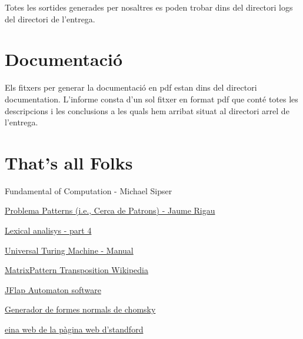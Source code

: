 \documentclass[12pt,a4paper]{report}
\begin{document}
Totes les sortides generades per nosaltres es poden trobar dins del directori logs del directori de l'entrega.

\section{Documentació}

Els fitxers per generar la documentació en pdf estan dins del directori documentation. L'informe consta d'un sol fitxer en format pdf que conté totes les descripcions i les conclusions a les quals hem arribat situat al directori arrel de l'entrega.

\section{That's all Folks}



\begin{thebibliography}{9}
Fundamental of Computation - Michael Sipser

\href{http://ima.udg.edu/~rigau/FC/FC_patterns.pdf}{Problema Patterns (i.e., Cerca de Patrons) - Jaume Rigau}

\href{http://ima.udg.edu/~rigau/FC/MFAP.pdf}{Lexical analisys - part 4}

\href{http://ima.udg.edu/~rigau/FC/utm_read_me.pdf}{Universal Turing Machine - Manual}

\href{https://en.wikipedia.org/wiki/Transpose}{MatrixPattern Transposition Wikipedia}

\href{http://www.jflap.org/}{JFlap Automaton software}

\href{https://mpeveler.com/assets/content/projects/cfg2cnf.php}{Generador de formes normals de chomsky}

\href{https://web.stanford.edu/class/archive/cs/cs103/cs103.1156/tools/cfg/}{eina web de la pàgina web d’standford}

\end{thebibliography}

\printindex
\end{document}
